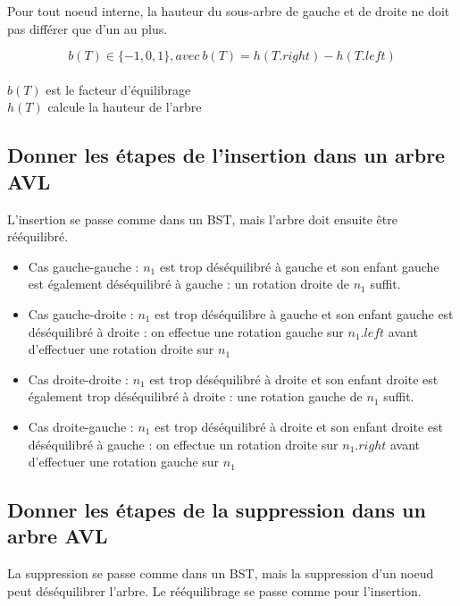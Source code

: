 \documentclass[11pt]{article}
\begin{document}
Pour tout noeud interne, la hauteur du sous-arbre de gauche et de droite ne doit pas différer que d'un au plus.

\begin{equation}
	b(T) \in \{-1, 0, 1\}, avec\ b(T) = h(T.right) - h(T.left)
\end{equation}
\\
$b(T)$ est le facteur d'équilibrage\\
$h(T)$ calcule la hauteur de l'arbre

\subsection{Donner les étapes de l'insertion dans un arbre AVL}

L'insertion se passe comme dans un BST, mais l'arbre doit ensuite être rééquilibré.

\begin{itemize}
	\item Cas gauche-gauche : $n_1$ est trop déséquilibré à gauche et son enfant gauche est également déséquilibré à gauche : un rotation droite de $n_1$ suffit.
	\item Cas gauche-droite : $n_1$ est trop déséquilibre à gauche et son enfant gauche est déséquilibré à droite : on effectue une rotation gauche sur $n_1.left$ avant d'effectuer une rotation droite sur $n_1$ 
	\item Cas droite-droite : $n_1$ est trop déséquilibré à droite et son enfant droite est également trop déséquilibré à droite : une rotation gauche de $n_1$ suffit.
	\item Cas droite-gauche : $n_1$ est trop déséquilibré à droite et son enfant droite est déséquilibré à gauche : on effectue un rotation droite sur $n_1.right$ avant d'effectuer une rotation gauche sur $n_1$
\end{itemize}

\subsection{Donner les étapes de la suppression dans un arbre AVL}

La suppression se passe comme dans un BST, mais la suppression d'un noeud peut déséquilibrer l'arbre. Le rééquilibrage se passe comme pour l'insertion.
\end{document}
